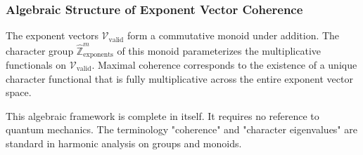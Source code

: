 \subsubsection{Algebraic Structure of Exponent Vector Coherence}

The exponent vectors $\mathcal{V}_{\text{valid}}$ form a commutative monoid under addition. The character group $\hat{\mathbb{Z}}^m_{\text{exponents}}$ of this monoid parameterizes the multiplicative functionals on $\mathcal{V}_{\text{valid}}$. Maximal coherence corresponds to the existence of a unique character functional that is fully multiplicative across the entire exponent vector space.

This algebraic framework is complete in itself. It requires no reference to quantum mechanics. The terminology "coherence" and "character eigenvalues" are standard in harmonic analysis on groups and monoids.
